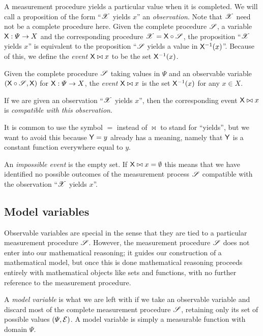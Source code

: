 A measurement procedure yields a particular value when it is completed. We will call a proposition of the form ``$\mathscr{X}$ yields $x$'' an \emph{observation}. Note that $\mathscr{X}$ need not be a complete procedure here. Given the complete procedure $\mathscr{S}$, a variable $\mathsf{X}:\Psi\to X$ and the corresponding procedure $\mathscr{X}=\mathsf{X}\circ\mathscr{S}$, the proposition ``$\mathscr{X}$ yields $x$'' is equivalent to the proposition ``$\mathscr{S}$ yields a value in $\mathsf{X}^{-1}(x)$''. Because of this, we define the \emph{event} $\mathsf{X}\bowtie x$ to be the set $\mathsf{X}^{-1}(x)$.

\begin{definition}[Event]
Given the complete procedure $\mathscr{S}$ taking values in $\Psi$ and an observable variable $(\mathsf{X}\circ \mathscr{S},\mathsf{X})$ for $\mathsf{X}:\Psi\to X$, the \emph{event} $\mathsf{X}\bowtie x$ is the set $\mathsf{X}^{-1}(x)$ for any $x\in X$.
\end{definition}

If we are given an observation ``$\mathscr{X}$ yields $x$'', then the corresponding event $\mathsf{X}\bowtie x$ is \emph{compatible with this observation}.

It is common to use the symbol $=$ instead of $\bowtie$ to stand for ``yields'', but we want to avoid this because $\mathsf{Y}=y$ already has a meaning, namely that $\mathsf{Y}$ is a constant function everywhere equal to $y$.

An \emph{impossible event} is the empty set. If $\mathsf{X}\bowtie x=\emptyset$ this means that we have identified no possible outcomes of the measurement process $\mathscr{S}$ compatible with the observation ``$\mathscr{X}$ yields $x$''. 

\subsection{Model variables}

Observable variables are special in the sense that they are tied to a particular measurement procedure $\mathscr{S}$. However, the measurement procedure $\mathscr{S}$ does not enter into our mathematical reasoning; it guides our construction of a mathematical model, but once this is done mathematical reasoning proceeds entirely with mathematical objects like sets and functions, with no further reference to the measurement procedure.

A \emph{model variable} is what we are left with if we take an observable variable and discard most of the complete measurement procedure $\mathscr{S}$, retaining only its set of possible values $(\Psi,\mathcal{E})$. A model variable is simply a measurable function with domain $\Psi$.

